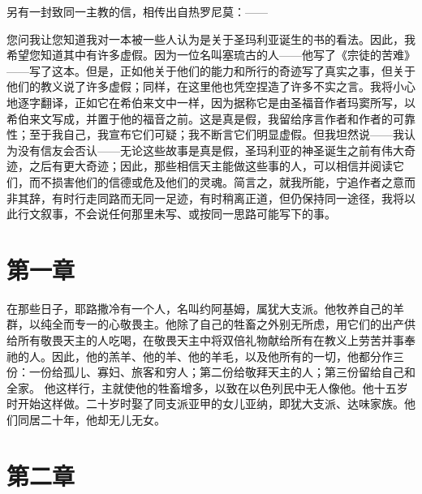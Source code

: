 另有一封致同一主教的信，相传出自热罗尼莫：——\par

您问我让您知道我对一本被一些人认为是关于圣玛利亚诞生的书的看法。因此，我希望您知道其中有许多虚假。因为一位名叫塞琉古的人——他写了《宗徒的苦难》——写了这本。但是，正如他关于他们的能力和所行的奇迹写了真实之事，但关于他们的教义说了许多虚假；同样，在这里他也凭空捏造了许多不实之言。我将小心地逐字翻译，正如它在希伯来文中一样，因为据称它是由圣福音作者玛窦所写，以希伯来文写成，并置于他的福音之前。这是真是假，我留给序言作者和作者的可靠性；至于我自己，我宣布它们可疑；我不断言它们明显虚假。但我坦然说——我认为没有信友会否认——无论这些故事是真是假，圣玛利亚的神圣诞生之前有伟大奇迹，之后有更大奇迹；因此，那些相信天主能做这些事的人，可以相信并阅读它们，而不损害他们的信德或危及他们的灵魂。简言之，就我所能，宁追作者之意而非其辞，有时行走同路而无同一足迹，有时稍离正道，但仍保持同一途径，我将以此行文叙事，不会说任何那里未写、或按同一思路可能写下的事。\par


\section{第一章}

在那些日子，耶路撒冷有一个人，名叫约阿基姆，属犹大支派。他牧养自己的羊群，以纯全而专一的心敬畏主。他除了自己的牲畜之外别无所虑，用它们的出产供给所有敬畏天主的人吃喝，在敬畏天主中将双倍礼物献给所有在教义上劳苦并事奉祂的人。因此，他的羔羊、他的羊、他的羊毛，以及他所有的一切，他都分作三份：一份给孤儿、寡妇、旅客和穷人；第二份给敬拜天主的人；第三份留给自己和全家。 他这样行，主就使他的牲畜增多，以致在以色列民中无人像他。他十五岁时开始这样做。二十岁时娶了同支派亚甲的女儿亚纳，即犹大支派、达味家族。他们同居二十年，他却无儿无女。\par


\section{第二章}

